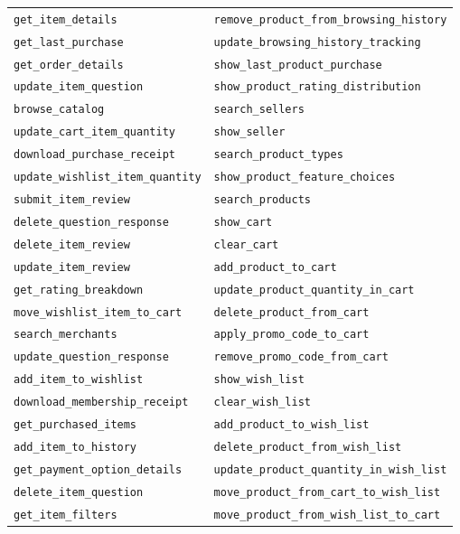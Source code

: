 \documentclass[11pt]{article}
\begin{document}
\begin{longtable}{ll}
\texttt{get\_item\_details} & \texttt{remove\_product\_from\_browsing\_history} \\
\texttt{get\_last\_purchase} & \texttt{update\_browsing\_history\_tracking} \\
\texttt{get\_order\_details} & \texttt{show\_last\_product\_purchase} \\
\texttt{update\_item\_question} & \texttt{show\_product\_rating\_distribution} \\
\texttt{browse\_catalog} & \texttt{search\_sellers} \\
\texttt{update\_cart\_item\_quantity} & \texttt{show\_seller} \\
\texttt{download\_purchase\_receipt} & \texttt{search\_product\_types} \\
\texttt{update\_wishlist\_item\_quantity} & \texttt{show\_product\_feature\_choices} \\
\texttt{submit\_item\_review} & \texttt{search\_products} \\
\texttt{delete\_question\_response} & \texttt{show\_cart} \\
\texttt{delete\_item\_review} & \texttt{clear\_cart} \\
\texttt{update\_item\_review} & \texttt{add\_product\_to\_cart} \\
\texttt{get\_rating\_breakdown} & \texttt{update\_product\_quantity\_in\_cart} \\
\texttt{move\_wishlist\_item\_to\_cart} & \texttt{delete\_product\_from\_cart} \\
\texttt{search\_merchants} & \texttt{apply\_promo\_code\_to\_cart} \\
\texttt{update\_question\_response} & \texttt{remove\_promo\_code\_from\_cart} \\
\texttt{add\_item\_to\_wishlist} & \texttt{show\_wish\_list} \\
\texttt{download\_membership\_receipt} & \texttt{clear\_wish\_list} \\
\texttt{get\_purchased\_items} & \texttt{add\_product\_to\_wish\_list} \\
\texttt{add\_item\_to\_history} & \texttt{delete\_product\_from\_wish\_list} \\
\texttt{get\_payment\_option\_details} & \texttt{update\_product\_quantity\_in\_wish\_list} \\
\texttt{delete\_item\_question} & \texttt{move\_product\_from\_cart\_to\_wish\_list} \\
\texttt{get\_item\_filters} & \texttt{move\_product\_from\_wish\_list\_to\_cart} \\

\end{longtable}
\end{document}
